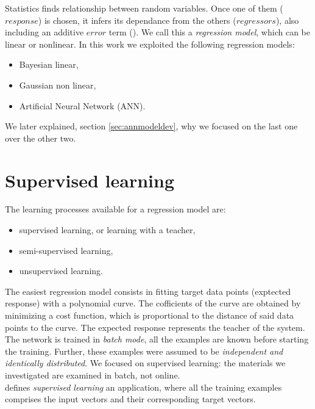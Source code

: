 Statistics finds relationship between random variables.
Once one of them ($response$) is chosen, it infers its dependance from the
others ($regressors$), also including an additive $error$ term
(\citet{RefWorks:194}). We call this a \textit{regression model}, which can be
linear or nonlinear.
In this work we exploited the following regression models:
\begin{itemize}
  \item{Bayesian linear,}
  \item{Gaussian non linear,}
  \item{Artificial Neural Network (\acs{ANN}).}
\end{itemize}
We later explained, section \ref{sec:annmodeldev}, why we focused on the last
one over the other two.


\section{Supervised learning}
\label{sec:supervisedlearning}

The learning processes available for a regression model are:

\begin{itemize}
  \item{supervised learning, or learning with a teacher,}
  \item{semi-supervised learning,}
  \item{unsupervised learning.}
\end{itemize}

The easiest regression model consists in fitting target data
points (exptected response) with a polynomial curve.
The cofficients of the curve are obtained by minimizing a cost function, which
is proportional to the distance of said data points to the curve.
The expected response represents the teacher of the system.
The network is trained in \textit{batch mode}, all the examples are known before
starting the training.
Further, these examples were assumed to be \textit{independent and identically
distributed}.
We focused on supervised learning: the materials we investigated
are examined in batch, not online.\\
\citet{RefWorks:194} defines \textit{supervised learning} an application, where all the
training examples comprises the input vectors and their corresponding target
vectors.

